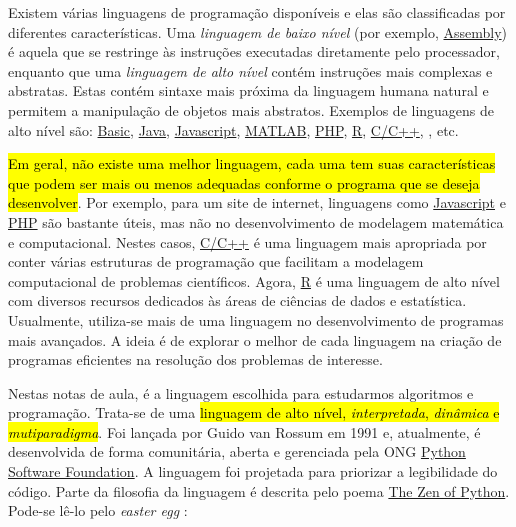 Existem várias linguagens de programação disponíveis e elas são classificadas por diferentes características. Uma \emph{linguagem de baixo nível} (por exemplo, \href{https://pt.wikipedia.org/wiki/Linguagem_assembly}{Assembly}) é aquela que se restringe às instruções executadas diretamente pelo processador, enquanto que uma \emph{linguagem de alto nível} contém instruções mais complexas e abstratas. Estas contém sintaxe mais próxima da linguagem humana natural e permitem a manipulação de objetos mais abstratos. Exemplos de linguagens de alto nível são: \href{https://pt.wikipedia.org/wiki/BASIC}{Basic}, \href{https://pt.wikipedia.org/wiki/Java\_(linguagem\_de\_programa\%C3\%A7\%C3\%A3o)}{Java}, \href{https://pt.wikipedia.org/wiki/JavaScript}{Javascript}, \href{https://pt.wikipedia.org/wiki/MATLAB}{MATLAB}, \href{https://pt.wikipedia.org/wiki/PHP}{PHP}, \href{https://pt.wikipedia.org/wiki/R\_(linguagem_de_programa\%C3\%A7\%C3\%A3o)}{R}, \href{https://pt.wikipedia.org/wiki/C\%2B\%2B}{C/C++}, {\python}, etc.

\hl{Em geral, não existe uma melhor linguagem, cada uma tem suas características que podem ser mais ou menos adequadas conforme o programa que se deseja desenvolver}. Por exemplo, para um site de internet, linguagens como \href{https://pt.wikipedia.org/wiki/JavaScript}{Javascript} e \href{https://pt.wikipedia.org/wiki/PHP}{PHP} são bastante úteis, mas não no desenvolvimento de modelagem matemática e computacional. Nestes casos, \href{https://pt.wikipedia.org/wiki/C\%2B\%2B}{C/C++} é uma linguagem mais apropriada por conter várias estruturas de programação que facilitam a modelagem computacional de problemas científicos. Agora, \href{https://pt.wikipedia.org/wiki/R\_(linguagem_de_programa\%C3\%A7\%C3\%A3o)}{R} é uma linguagem de alto nível com diversos recursos dedicados às áreas de ciências de dados e estatística. Usualmente, utiliza-se mais de uma linguagem no desenvolvimento de programas mais avançados. A ideia é de explorar o melhor de cada linguagem na criação de programas eficientes na resolução dos problemas de interesse.

Nestas notas de aula, \hl{{\python}} é a linguagem escolhida para estudarmos algoritmos e programação. Trata-se de uma \hl{linguagem de alto nível, \emph{interpretada}, \emph{dinâmica} e \emph{mutiparadigma}}. Foi lançada por Guido van Rossum{\rossum} em 1991 e, atualmente, é desenvolvida de forma comunitária, aberta e gerenciada pela ONG \href{https://pt.wikipedia.org/wiki/Python_Software_Foundation}{Python Software Foundation}. A linguagem foi projetada para priorizar a legibilidade do código. Parte da filosofia da linguagem é descrita pelo poema \href{https://pt.wikipedia.org/wiki/Zen_de_Python}{The Zen of Python}. Pode-se lê-lo pelo \textit{easter egg} {\python}:

